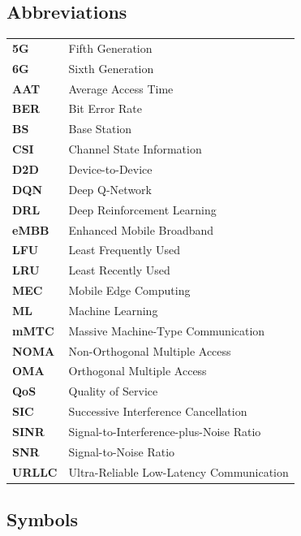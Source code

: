 \documentclass[12pt,a4paper]{article}
\begin{document}
\subsection*{Abbreviations}

\begin{tabular}{@{}ll@{}}
\textbf{5G} & Fifth Generation \\
\textbf{6G} & Sixth Generation \\
\textbf{AAT} & Average Access Time \\
\textbf{BER} & Bit Error Rate \\
\textbf{BS} & Base Station \\
\textbf{CSI} & Channel State Information \\
\textbf{D2D} & Device-to-Device \\
\textbf{DQN} & Deep Q-Network \\
\textbf{DRL} & Deep Reinforcement Learning \\
\textbf{eMBB} & Enhanced Mobile Broadband \\
\textbf{LFU} & Least Frequently Used \\
\textbf{LRU} & Least Recently Used \\
\textbf{MEC} & Mobile Edge Computing \\
\textbf{ML} & Machine Learning \\
\textbf{mMTC} & Massive Machine-Type Communication \\
\textbf{NOMA} & Non-Orthogonal Multiple Access \\
\textbf{OMA} & Orthogonal Multiple Access \\
\textbf{QoS} & Quality of Service \\
\textbf{SIC} & Successive Interference Cancellation \\
\textbf{SINR} & Signal-to-Interference-plus-Noise Ratio \\
\textbf{SNR} & Signal-to-Noise Ratio \\
\textbf{URLLC} & Ultra-Reliable Low-Latency Communication \\
\end{tabular}

\subsection*{Symbols}
\end{document}
